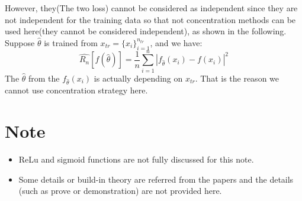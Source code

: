 \documentclass{article}
\begin{document}
\noindent
However, they(The two loss) cannot be considered as independent since they are not independent for the training data so that not concentration methods can be used here(they cannot be considered independent), as shown in the following. Suppose $\widehat{\theta}$ is trained from $x_{tr} = \{ x_i \} ^{n_{tr}}_{i=1}$, and we have:
\[
\widehat{R_n}[f(\widehat{\theta})] = \frac{1}{n} \sum_{i=1}^n |f_{\widehat{\theta}}(x_i) - f(x_i)|^2
\]
The $\widehat{\theta}$ from the $f_{\widehat{\theta}}(x_i)$ is actually depending on $x_{tr}$. That is the reason we cannot use concentration strategy here.

\section{Note}
\begin{itemize}
\item ReLu and sigmoid functions are not fully discussed for this note. 
\item Some details or build-in theory are referred from the papers and the details (such as prove or demonstration) are not provided here.
\end{itemize}
\end{document}
